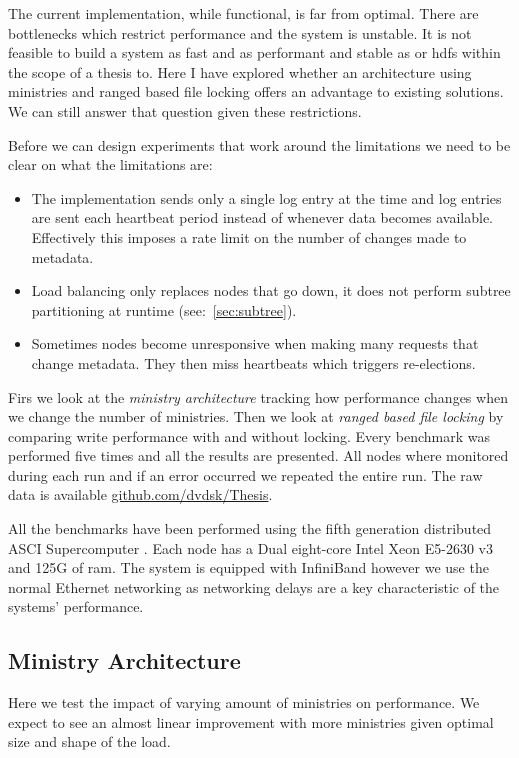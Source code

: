The current implementation, while functional, is far from optimal. There are bottlenecks which restrict performance and the system is unstable. It is not feasible to build a system as fast and as performant and stable as \ceph{} or \ac{hdfs} within the scope of a thesis to. Here I have explored whether an architecture using ministries and ranged based file locking offers an advantage to existing solutions. We can still answer that question given these restrictions. 

Before we can design experiments that work around the limitations we need to be clear on what the limitations are:

\begin{itemize}
	\item The \raft{} implementation sends only a single log entry at the time and log entries are sent each heartbeat period instead of whenever data becomes available. Effectively this imposes a rate limit on the number of changes made to metadata.
	\item Load balancing only replaces nodes that go down, it does not perform subtree partitioning at runtime (see:~\cref{sec:subtree}).
	\item Sometimes nodes become unresponsive when making many requests that change metadata. They then miss heartbeats which triggers re-elections.
\end{itemize}

Firs we look at the \textit{ministry architecture} tracking how performance changes when we change the number of ministries. Then we look at \textit{ranged based file locking} by comparing write performance with and without locking. Every benchmark was performed five times and all the results are presented. All nodes where monitored during each run and if an error occurred we repeated the entire run. The raw data is available \href{https://github.com/dvdsk/Thesis}{github.com/dvdsk/Thesis}.

All the benchmarks have been performed using the fifth generation distributed ASCI Supercomputer \cite{das5}. Each node has a Dual eight-core Intel Xeon E5-2630 v3 and 125G of ram. The system is equipped with InfiniBand however we use the normal Ethernet networking as networking delays are a key characteristic of the systems' performance.

\subsection{Ministry Architecture}
Here we test the impact of varying amount of ministries on performance. We expect to see an almost linear improvement with more ministries given optimal size and shape of the load.

